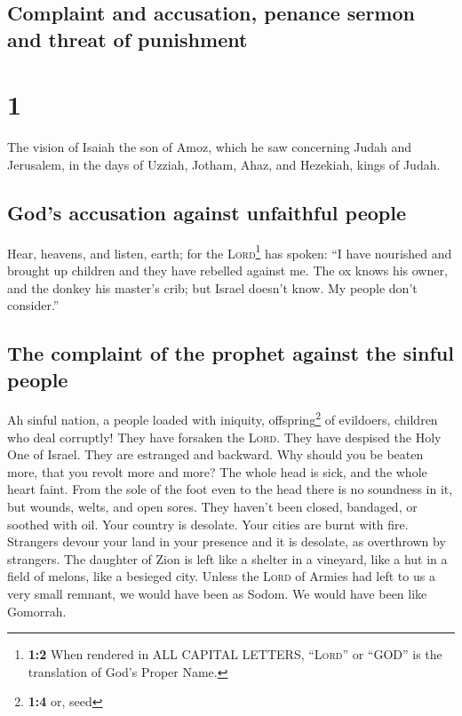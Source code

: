 \hypertarget{complaint-and-accusation-penance-sermon-and-threat-of-punishment}{%
\subsection{Complaint and accusation, penance sermon and threat of
punishment}\label{complaint-and-accusation-penance-sermon-and-threat-of-punishment}}

\hypertarget{section}{%
\section{1}\label{section}}

 The vision of Isaiah the son of Amoz, which he saw
concerning Judah and Jerusalem, in the days of Uzziah, Jotham, Ahaz, and
Hezekiah, kings of Judah.

\hypertarget{gods-accusation-against-unfaithful-people}{%
\subsection{God's accusation against unfaithful
people}\label{gods-accusation-against-unfaithful-people}}

 Hear, heavens, and listen, earth; for the
\textsc{Lord}\footnote{\textbf{1:2} When rendered in ALL CAPITAL
  LETTERS, ``\textsc{Lord}'' or ``GOD'' is the translation of God's
  Proper Name.} has spoken: ``I have nourished and brought up children
and they have rebelled against me.  The ox knows his
owner, and the donkey his master's crib; but Israel doesn't know. My
people don't consider.''

\hypertarget{the-complaint-of-the-prophet-against-the-sinful-people}{%
\subsection{The complaint of the prophet against the sinful
people}\label{the-complaint-of-the-prophet-against-the-sinful-people}}

 Ah sinful nation, a people loaded with iniquity,
offspring\footnote{\textbf{1:4} or, seed} of evildoers, children who
deal corruptly! They have forsaken the \textsc{Lord}. They have despised
the Holy One of Israel. They are estranged and backward. 
Why should you be beaten more, that you revolt more and more? The whole
head is sick, and the whole heart faint.  From the sole of
the foot even to the head there is no soundness in it, but wounds,
welts, and open sores. They haven't been closed, bandaged, or soothed
with oil.  Your country is desolate. Your cities are burnt
with fire. Strangers devour your land in your presence and it is
desolate, as overthrown by strangers.  The daughter of
Zion is left like a shelter in a vineyard, like a hut in a field of
melons, like a besieged city.  Unless the \textsc{Lord} of
Armies had left to us a very small remnant, we would have been as Sodom.
We would have been like Gomorrah.

